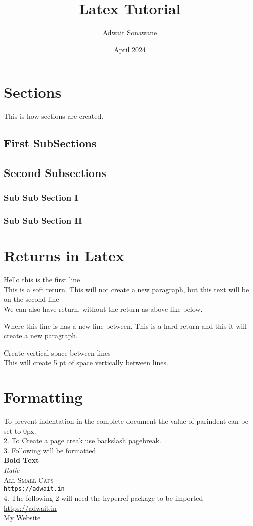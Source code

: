 \documentclass{article}
\title{Latex Tutorial}
\author{Adwait Sonawane}
\date{April 2024}
\begin{document}
\tableofcontents %
\maketitle

\section{Sections}
This is how sections are created.
\subsection{First SubSections}
\subsection*{Second Subsections} %
    \subsubsection{Sub Sub Section I}
    \subsubsection{Sub Sub Section II}

\section{Returns in Latex}
Hello this is the first line\\
This is a soft return. This will not create a new paragraph, but this text will be on the second line\\
We can also have return, without the return as above like below.

Where this line is has a new line between. This is a hard return and this it will create a new paragraph.

Create vertical space between lines\\[5pt]
This will create 5 pt of space vertically between lines.

\section{Formatting}

To prevent indentation in the complete document the value of parindent can be set to 0px.\\
2. To Create a page creak use backslash pagebreak.\\
3. Following will be formatted \\ 
\textbf{Bold Text}\\
\textit{Italic}\\
\textsc{All Small Caps}\\
\texttt{https://adwait.in}\\
4. The following 2 will need the hyperref package to be imported\\
\url{https://adwait.in}\\
\href{https://adwait.in}{My Website}
\end{document}

